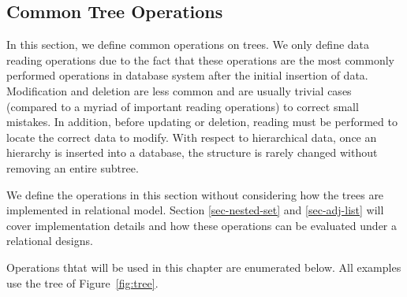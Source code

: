 \subsection{Common Tree Operations}\label{sec_tree_ops}

In this section, we define common operations on trees. We only define data reading operations due to the fact that these operations are the most commonly performed operations in database system after the initial insertion of data. Modification and deletion are less common and are usually trivial cases (compared to a myriad of important reading operations) to correct small mistakes. In addition, before updating or deletion, reading must be performed to locate the correct data to modify. With respect to hierarchical data, once an hierarchy is inserted into a database, the structure is rarely changed without removing an entire subtree.

We define the operations in this section without considering how the trees are implemented in relational model. Section \ref{sec-nested-set} and \ref{sec-adj-list} will cover implementation details and how these operations can be evaluated under a relational designs.


Operations thtat will be used in this chapter are enumerated below. All examples use the tree of Figure~\ref{fig:tree}.



